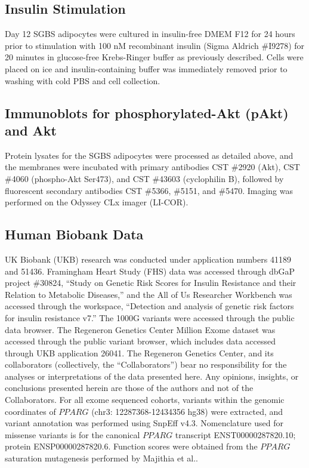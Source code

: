 \subsection{Insulin Stimulation}
Day 12 SGBS adipocytes were cultured in insulin-free DMEM F12 for 24 hours prior to stimulation with 100 nM recombinant insulin (Sigma Aldrich \#I9278) for 20 minutes in glucose-free Krebs-Ringer buffer as previously described\cite{Tews2022-am}. Cells were placed on ice and insulin-containing buffer was immediately removed prior to washing with cold PBS and cell collection.

\subsection{Immunoblots for phosphorylated-Akt (pAkt) and Akt}
Protein lysates for the SGBS adipocytes were processed as detailed above, and the membranes were incubated with primary antibodies CST \#2920 (Akt), CST \#4060 (phospho-Akt Ser473), and CST \#43603 (cyclophilin B), followed by fluorescent secondary antibodies CST \#5366, \#5151, and \#5470. Imaging was performed on the Odyssey CLx imager (LI-COR).

\subsection{Human Biobank Data}
UK Biobank (UKB) research was conducted under application numbers 41189 and 51436. Framingham Heart Study (FHS) data was accessed through dbGaP project \#30824, “Study on Genetic Risk Scores for Insulin Resistance and their Relation to Metabolic Diseases,” and the All of Us Researcher Workbench was accessed through the workspace, “Detection and analysis of genetic risk factors for insulin resistance v7.” The 1000G variants were accessed through the public data browser\cite{1000_Genomes_Project_Consortium2015-fz}. The Regeneron Genetics Center Million Exome dataset was accessed through the public variant browser\cite{Sun2023-ty}, which includes data accessed through UKB application 26041. The Regeneron Genetics Center, and its collaborators (collectively, the “Collaborators”) bear no responsibility for the analyses or interpretations of the data presented here. Any opinions, insights, or conclusions presented herein are those of the authors and not of the Collaborators. For all exome sequenced cohorts, variants within the genomic coordinates of \(PPARG\) (chr3: 12287368-12434356 hg38) were extracted, and variant annotation was performed using SnpEff v4.3\cite{Cingolani2012-gd}. Nomenclature used for missense variants is for the canonical \(PPARG\) transcript ENST00000287820.10; protein ENSP00000287820.6. Function scores were obtained from the \(PPARG\) saturation mutagenesis performed by Majithia et al.\cite{Majithia2016-bm}.

